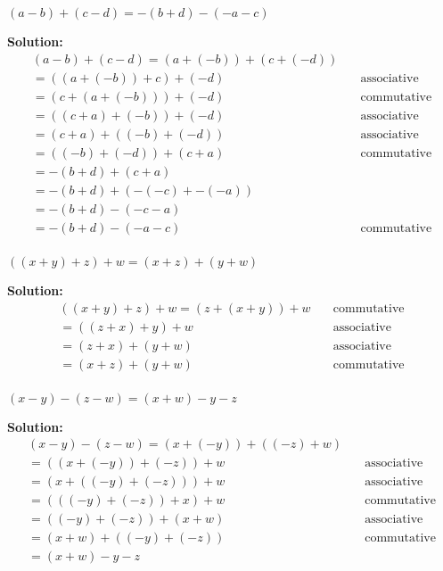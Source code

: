 \documentclass[6pt]{article}
\begin{document}
\begin{tcolorbox}[title=Problem 7, breakable]
$(a - b) + (c - d) = -(b + d) - (-a - c)$
\end{tcolorbox}

\textbf{Solution:}
\begin{align*}
(a - b) + (c - d) = (a + (-b)) + (c + (-d)) & \quad \text{} \\
=((a + (-b)) + c) + (-d) & \quad \text{associative} \\
=(c + (a + (-b))) + (-d) & \quad \text{commutative} \\
=((c + a) + (-b)) + (-d) & \quad \text{associative} \\
=(c + a) + ((-b) + (-d)) & \quad \text{associative} \\
=((-b) + (-d)) + (c + a) & \quad \text{commutative} \\
=-(b + d) + (c + a) & \quad \text{} \\
=-(b + d) + (-(-c) + -(-a)) & \quad \text{} \\
=-(b + d) - (-c - a) & \quad \text{} \\
=-(b + d) - (-a - c) & \quad \text{commutative} \\
\end{align*}

\begin{tcolorbox}[title=Problem 8, breakable]
$((x + y) + z) + w = (x + z) + (y + w)$
\end{tcolorbox}

\textbf{Solution:}
\begin{align*}
((x + y) + z) + w  = (z + (x + y)) + w & \quad \text{commutative} \\
=((z + x) + y) + w & \quad \text{associative} \\
=(z + x) + (y + w) & \quad \text{associative} \\
=(x + z) + (y + w) & \quad \text{commutative} \\
\end{align*}


\begin{tcolorbox}[title=Problem 9, breakable]
$(x - y) - (z - w) = (x + w) - y - z$
\end{tcolorbox}

\textbf{Solution:}
\begin{align*}
(x - y) - (z - w)  = (x + (-y)) + ((-z) + w)  & \quad \text{} \\
=((x + (-y)) + (-z)) + w & \quad \text{associative} \\
=(x + ((-y) + (-z))) + w & \quad \text{associative} \\
=(((-y) + (-z)) + x) + w & \quad \text{commutative} \\
=((-y) + (-z)) + (x + w) & \quad \text{associative} \\
=(x + w) + ((-y) + (-z)) & \quad \text{commutative} \\
=(x + w) - y - z & \quad \text{} \\
\end{align*}
\end{document}
